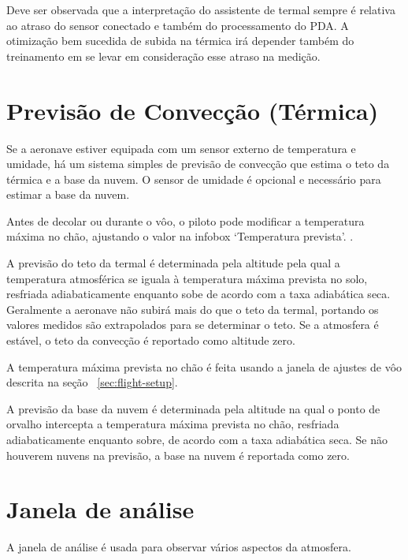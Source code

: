 Deve ser observada que a interpretação do assistente de termal sempre é relativa ao atraso do sensor conectado e também do processamento do PDA.  A otimização bem sucedida de subida na térmica irá depender também do treinamento em se levar em consideração esse atraso na medição.


\section{Previsão de Convecção (Térmica)}\label{sec:convection-forecast}

Se a aeronave estiver equipada com um sensor externo de temperatura e umidade, há um sistema simples de previsão de convecção que estima o teto da térmica e a base da nuvem.  O sensor de umidade é opcional e necessário para estimar a base da nuvem.

Antes de decolar ou durante o vôo, o piloto pode modificar a temperatura máxima no chão, ajustando o valor na infobox ‘Temperatura prevista’.  
 {\InfoBox}.

A previsão do teto da termal é determinada pela altitude pela qual a temperatura atmosférica se iguala à temperatura máxima prevista no solo, resfriada adiabaticamente enquanto sobe de acordo com a taxa adiabática seca.  Geralmente a aeronave não subirá mais do que o teto da termal, portando os valores medidos são extrapolados para se determinar o teto.  Se a atmosfera é estável, o teto da convecção é reportado como altitude zero.

A temperatura máxima prevista no chão é feita usando a janela de ajustes de vôo descrita na seção 
~\ref{sec:flight-setup}.


%

A previsão da base da nuvem é determinada pela altitude na qual o ponto de orvalho intercepta a temperatura máxima prevista no chão, resfriada adiabaticamente enquanto sobre, de acordo com a taxa adiabática seca.  Se não houverem nuvens na previsão, a base na nuvem é reportada como zero.


\section{Janela de análise}

A janela de análise é usada para observar vários aspectos da atmosfera.

